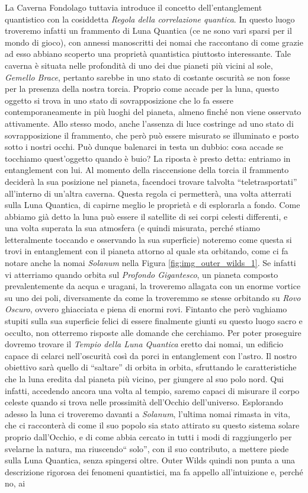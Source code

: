 \documentclass{book}
\theoremstyle{definition}
\theoremstyle{definition}
\theoremstyle{definition}
\theoremstyle{plain}
\theoremstyle{plain}
\theoremstyle{plain}
\theoremstyle{plain}
\begin{document}
La Caverna Fondolago tuttavia introduce il concetto dell'entanglement quantistico con la cosiddetta \emph{Regola della correlazione quantica}. In questo luogo troveremo infatti un frammento di Luna Quantica (ce ne sono vari sparsi per il mondo di gioco), con annessi manoscritti dei nomai che raccontano di come grazie ad esso abbiano scoperto una proprietà quantistica piuttosto interessante. Tale caverna è situata nelle profondità di uno dei due pianeti più vicini al sole, \emph{Gemello Brace}, pertanto sarebbe in uno stato di costante oscurità se non fosse per la presenza della nostra torcia. Proprio come accade per la luna, questo oggetto si trova in uno stato di sovrapposizione che lo fa essere contemporaneamente in più luoghi del pianeta, almeno finché non viene osservato attivamente. Allo stesso modo, anche l'assenza di luce costringe ad uno stato di sovrapposizione il frammento, che però può essere misurato se illuminato e posto sotto i nostri occhi. Può dunque balenarci in testa un dubbio: cosa accade se tocchiamo quest'oggetto quando è buio? La riposta è presto detta: entriamo in entanglement con lui. Al momento della riaccensione della torcia il frammento deciderà la sua posizione nel pianeta, facendoci trovare talvolta ``teletrasportati'' all'interno di un'altra caverna. Questa regola ci permetterà, una volta atterrati sulla Luna Quantica, di capirne meglio le proprietà e di esplorarla a fondo. Come abbiamo già detto la luna può essere il satellite di sei corpi celesti differenti, e una volta superata la sua atmosfera (e quindi misurata, perché stiamo letteralmente toccando e osservando la sua superficie) noteremo come questa si trovi in entanglement con il pianeta attorno al quale sta orbitando, come ci fa notare anche la nomai \emph{Solanum} nella Figura \ref{fig:img_outer_wilds_1}. Se infatti vi atterriamo quando orbita sul \emph{Profondo Gigantesco}, un pianeta composto prevalentemente da acqua e uragani, la troveremo allagata con un enorme vortice su uno dei poli, diversamente da come la troveremmo se stesse orbitando su \emph{Rovo Oscuro}, ovvero ghiacciata e piena di enormi rovi. Fintanto che però vaghiamo stupiti sulla sua superficie felici di essere finalmente giunti su questo luogo sacro e occulto, non otterremo risposte alle domande che cerchiamo. Per poter proseguire dovremo trovare il \emph{Tempio della Luna Quantica} eretto dai nomai, un edificio capace di celarci nell'oscurità così da porci in entanglement con l'astro. Il nostro obiettivo sarà quello di ``saltare'' di orbita in orbita, sfruttando le caratteristiche che la luna eredita dal pianeta più vicino, per giungere al suo polo nord. Qui infatti, accedendo ancora una volta al tempio, saremo capaci di misurare il corpo celeste quando si trova nelle prossimità dell'Occhio dell'universo. Esplorando adesso la luna ci troveremo davanti a \emph{Solanum}, l'ultima nomai rimasta in vita, che ci racconterà di come il suo popolo sia stato attirato su questo sistema solare proprio dall'Occhio, e di come abbia cercato in tutti i modi di raggiungerlo per svelarne la natura, ma riuscendo`` solo'', con il suo contributo, a mettere piede sulla Luna Quantica, senza spingersi oltre. Outer Wilds quindi non punta a una descrizione rigorosa dei fenomeni quantistici, ma fa appello all'intuizione e, perché no, ai 
\end{document}
